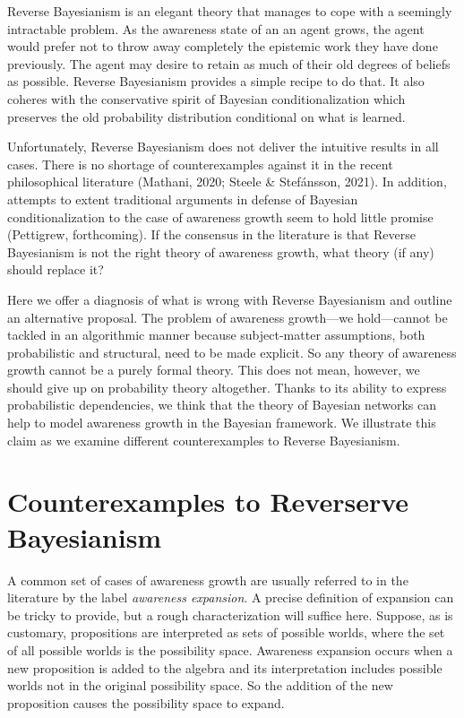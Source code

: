 \documentclass[
  11pt,
  dvipsnames,enabledeprecatedfontcommands]{scrartcl}
\begin{document}
Reverse Bayesianism is an elegant theory that manages to cope with a
seemingly intractable problem. As the awareness state of an an agent
grows, the agent would prefer not to throw away completely the epistemic
work they have done previously. The agent may desire to retain as much
of their old degrees of beliefs as possible. Reverse Bayesianism
provides a simple recipe to do that. It also coheres with the
conservative spirit of Bayesian conditionalization which preserves the
old probability distribution conditional on what is learned.

Unfortunately, Reverse Bayesianism does not deliver the intuitive
results in all cases. There is no shortage of counterexamples against it
in the recent philosophical literature (Mathani, 2020; Steele \&
Stefánsson, 2021). In addition, attempts to extent traditional arguments
in defense of Bayesian conditionalization to the case of awareness
growth seem to hold little promise (Pettigrew, forthcoming). If the
consensus in the literature is that Reverse Bayesianism is not the right
theory of awareness growth, what theory (if any) should replace it?

Here we offer a diagnosis of what is wrong with Reverse Bayesianism and
outline an alternative proposal. The problem of awareness growth---we
hold---cannot be tackled in an algorithmic manner because subject-matter
assumptions, both probabilistic and structural, need to be made
explicit. So any theory of awareness growth cannot be a purely formal
theory. This does not mean, however, we should give up on probability
theory altogether. Thanks to its ability to express probabilistic
dependencies, we think that the theory of Bayesian networks can help to
model awareness growth in the Bayesian framework. We illustrate this
claim as we examine different counterexamples to Reverse Bayesianism.

\hypertarget{counterexamples-to-reverserve-bayesianism}{%
\section{Counterexamples to Reverserve
Bayesianism}\label{counterexamples-to-reverserve-bayesianism}}

A common set of cases of awareness growth are usually referred to in the
literature by the label \emph{awareness expansion}. A precise definition
of expansion can be tricky to provide, but a rough characterization will
suffice here. Suppose, as is customary, propositions are interpreted as
sets of possible worlds, where the set of all possible worlds is the
possibility space. Awareness expansion occurs when a new proposition is
added to the algebra and its interpretation includes possible worlds not
in the original possibility space. So the addition of the new
proposition causes the possibility space to expand.
\end{document}
